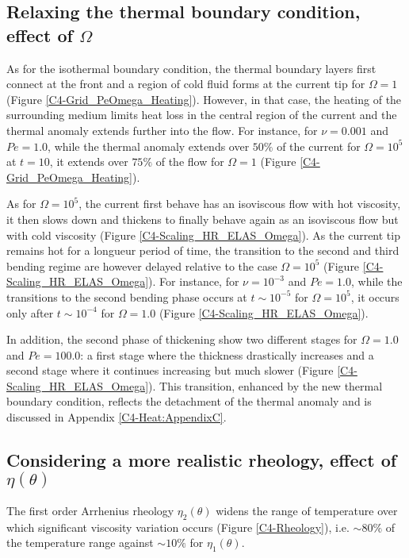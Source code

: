 \subsection{Relaxing  the   thermal  boundary  condition,   effect  of
  $\Omega$}
\label{C4-sec:infl-therm-bound}

As for the isothermal boundary  condition, the thermal boundary layers
first connect  at the front  and a region of  cold fluid forms  at the
current tip  for $\Omega = 1$  (Figure \ref{C4-Grid_PeOmega_Heating}).
However, in  that case, the  heating of the surrounding  medium limits
heat loss in the central region of the current and the thermal anomaly
extends  further into  the flow.   For instance,  for $\nu=0.001$  and
$Pe=1.0$, while the thermal anomaly extends over $50\%$ of the current
for $\Omega = 10^5$ at $t=10$, it  extends over $75\%$ of the flow for
$\Omega=1$ (Figure \ref{C4-Grid_PeOmega_Heating}).

As for $\Omega=10^5$, the current  first behave has an isoviscous flow
with hot viscosity, it then slows  down and thickens to finally behave
again  as  an   isoviscous  flow  but  with   cold  viscosity  (Figure
\ref{C4-Scaling_HR_ELAS_Omega}).  As the current tip remains hot for a
longueur  period of  time,  the  transition to  the  second and  third
bending regime are however delayed relative to the case $\Omega= 10^5$
(Figure    \ref{C4-Scaling_HR_ELAS_Omega}).     For   instance,    for
$\nu=10^{-3}$  and  $Pe=1.0$,  while  the transitions  to  the  second
bending phase occurs at $t\sim 10^{-5}$ for $\Omega=10^{5}$, it occurs
only    after   $t\sim    10^{-4}$   for    $\Omega=   1.0$    (Figure
\ref{C4-Scaling_HR_ELAS_Omega}).

In addition, the second phase  of thickening show two different stages
for $\Omega =  1.0$ and $Pe=100.0$: a first stage  where the thickness
drastically increases and a second stage where it continues increasing
but   much  slower   (Figure  \ref{C4-Scaling_HR_ELAS_Omega}).    This
transition, enhanced  by the new thermal  boundary condition, reflects
the detachment  of the  thermal anomaly and  is discussed  in Appendix
\ref{C4-Heat:AppendixC}.

\subsection{Considering   a  more   realistic   rheology,  effect   of
  $\eta(\theta)$}
\label{C4-sec:infl-therm-bound}


The first  order Arrhenius rheology $\eta_2(\theta)$  widens the range
of  temperature  over  which significant  viscosity  variation  occurs
(Figure \ref{C4-Rheology}), i.e.  $\sim80\%$  of the temperature range
against $\sim10\%$ for $\eta_1(\theta)$.

